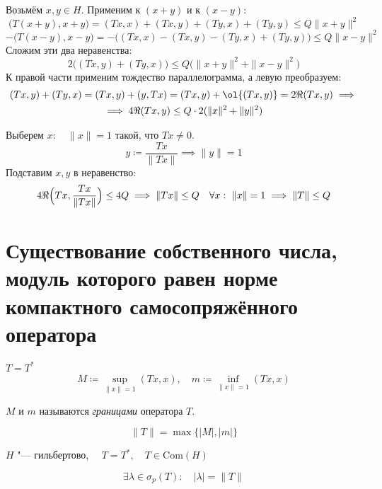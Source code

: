 \begin{eproof}
\begin{itemize}
			Возьмём $ x, y \in H $.
			Применим  к $ (x + y) $ и к $ (x - y) $:
			$$ \bigl( T(x + y), x + y \bigr) = (Tx, x) + (Tx, y) + (Ty, x) + (Ty, y) \le Q\|x + y\|^2 $$
			$$ -\bigl( T(x - y), x - y \bigr) = - \bigl( (Tx, x) - (Tx, y) - (Ty, x) + (Ty, y) \bigr) \le
			Q\|x - y\|^2 $$
			Сложим эти два неравенства:
			$$ 2 \bigl( (Tx, y) + (Ty, x) \bigr) \le Q \bigl( \|x + y\|^2 + \|x - y\|^2 \bigr) $$
			К правой части применим тождество параллелограмма, а левую преобразуем:
			\begin{multline*}
				(Tx, y) + (Ty, x) = (Tx, y) + (y, Tx) = (Tx, y) + \ol{(Tx, y)} = 2 \Re (Tx, y) \implies \\
				\implies 4 \Re (Tx, y) \le Q \cdot 2(\|x\|^2 + \|y\|^2)
			\end{multline*}

			Выберем $ x : \quad \|x\| = 1 $ такой, что $ Tx \ne 0 $.
			$$ y \coloneq \frac{Tx}{\|Tx\|} \implies \|y\| = 1 $$
			Подставим $ x, y $ в неравенство:
			$$ 4 \Re \Bigl( Tx, \frac{Tx}{\|Tx\|} \Bigr) \le 4Q \implies
			\|Tx\| \le Q \quad \forall x : ~ \|x\| = 1 \implies \|T\| \le Q $$
	\end{itemize}
\end{eproof}

\section{Существование собственного числа, модуль которого равен норме компактного
самосопряжённого оператора}

\begin{definition}
	$ T = T^* $
	$$ M \coloneq \sup\limits_{\|x\| = 1} (Tx, x), \quad m \coloneq \inf\limits_{\|x\| = 1}(Tx, x) $$

	$ M $ и $ m $ называются \emph{границами} оператора $ T $.
\end{definition}

\begin{remark}
	$$ \|T\| = \max\{|M|, |m|\} $$
\end{remark}

\begin{theorem}
	$ H $ "--- гильбертово, $ \quad T = T^*, \quad T \in \mathrm{Com}(H) $

	$$ \exists \lambda \in \sigma_p(T) : \quad |\lambda| = \|T\| $$
\end{theorem}

